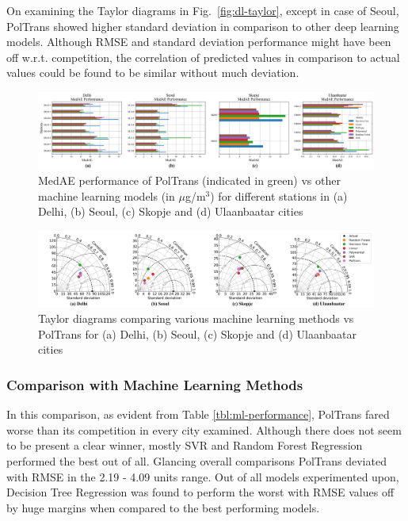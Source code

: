 \documentclass[10pt,journal]{IEEEtran}
\begin{document}
On examining the Taylor diagrams in Fig.~\ref{fig:dl-taylor}, except in case of Seoul, {PolTrans} showed higher standard deviation in comparison to other deep learning models. Although RMSE and standard deviation performance might have been off w.r.t. competition, the correlation of predicted values in comparison to actual values could be found to be similar without much deviation.

\begin{figure}[h]
\centering
\includegraphics[scale=0.365]{../paper_figures/ml_medae.png}
\caption{MedAE performance of {PolTrans} (indicated in green) vs other machine learning models (in $\mu$g/m$^{3}$) for different stations in (a) Delhi, (b) Seoul, (c) Skopje and (d) Ulaanbaatar cities}
\label{fig:ml-medae}
\end{figure}

\begin{figure}[h]
\centering
\includegraphics[width=18cm]{../paper_figures/merged_taylor_ml.png}
\caption{Taylor diagrams comparing various machine learning methods vs {PolTrans} for (a) Delhi, (b) Seoul, (c) Skopje and (d) Ulaanbaatar cities}
\label{fig:ml-taylor}
\end{figure}

\subsubsection{Comparison with Machine Learning Methods}
\label{sec:ml-comp}

In this comparison, as evident from Table \ref{tbl:ml-performance}, {PolTrans} fared worse than its competition in every city examined. Although there does not seem to be present a clear winner, mostly SVR and Random Forest Regression performed the best out of all. Glancing overall comparisons {PolTrans} deviated with RMSE in the 2.19 - 4.09 units range. Out of all models experimented upon, Decision Tree Regression was found to perform the worst with RMSE values off by huge margins when compared to the best performing models.
\end{document}

